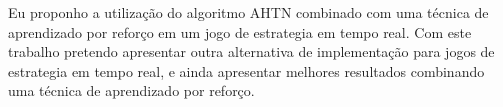 Eu proponho a utilização do algoritmo AHTN combinado com uma técnica de aprendizado por reforço em um jogo de estrategia em tempo real. Com este trabalho pretendo apresentar outra alternativa de implementação para jogos de estrategia em tempo real, e ainda apresentar melhores resultados combinando uma técnica de aprendizado por reforço.





